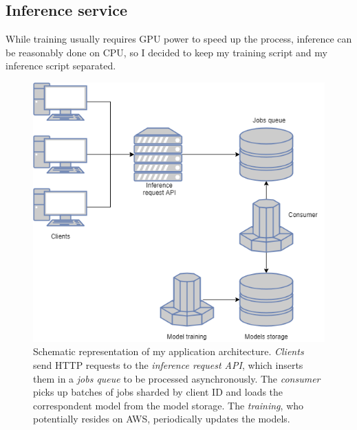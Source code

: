 \subsection{Inference service}
While training usually requires GPU power to speed up the process, inference can be reasonably done on CPU, so I decided to keep my training script and my inference script separated.

\begin{figure}[htbp]
\begin{center}
\includegraphics[width=\textwidth]{immagini/pictures/app.png} 
\caption{Schematic representation of my application architecture. \emph{Clients} send HTTP requests to the \emph{inference request API}, which inserts them in a \emph{jobs queue} to be processed asynchronously. The \emph{consumer} picks up batches of jobs sharded by client ID and loads the correspondent model from the model storage. The \emph{training}, who potentially resides on AWS, periodically updates the models.}
\end{center}
\end{figure}


